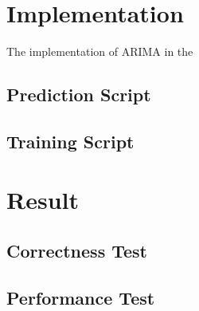 \chapter{Implementation}

The implementation of \acs{ARIMA} in the



\section{Prediction Script}



\section{Training Script}


    

\chapter{Result}

\section{Correctness Test}

\section{Performance Test}


















